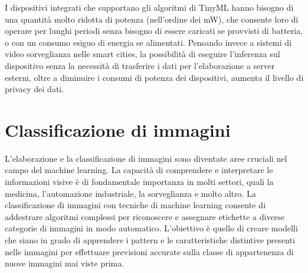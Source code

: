 I dispositivi integrati che supportano gli algoritmi di TinyML hanno bisogno di una quantità molto ridotta di potenza (nell'ordine dei mW), che consente loro di operare per lunghi periodi senza bisogno di essere caricati se provvisti di batteria, o con un consumo esiguo di energia se alimentati. Pensando invece a sistemi di video sorveglianza nelle smart cities, la possibilità di eseguire l'inferenza sul dispositivo senza la necessità di trasferire i dati per l'elaborazione a server esterni, oltre a diminuire i consumi di potenza dei dispositivi, aumenta il livello di privacy dei dati.

\section{Classificazione di immagini}

L'elaborazione e la classificazione di immagini sono diventate aree cruciali nel campo del machine learning. La capacità di comprendere e interpretare le informazioni visive è di fondamentale importanza in molti settori, quali la medicina, l'automazione industriale, la sorveglianza e molto altro.
La classificazione di immagini con tecniche di machine learning consente di addestrare algoritmi complessi per riconoscere e assegnare etichette a diverse categorie di immagini in modo automatico. L'obiettivo è quello di creare modelli che siano in grado di apprendere i pattern e le caratteristiche distintive presenti nelle immagini per effettuare previsioni accurate sulla classe di appartenenza di nuove immagini mai viste prima.

